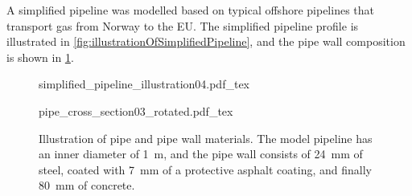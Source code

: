 A simplified pipeline was modelled based on typical offshore pipelines that transport gas from Norway to the EU. The simplified pipeline profile is illustrated in \cref{fig:illustrationOfSimplifiedPipeline}, and the pipe wall composition is shown in \cref{fig:pipeCrossSection}.



\begin{figure}[!ht]%
\centering%
\begin{minipage}{9.6cm}%
    {simplified_pipeline_illustration04.pdf_tex}%
    \\ %
    \parbox{0.9\textwidth}{%
        \vspace{2mm}%
        \caption{%
            Illustration of the simplified pipeline. The pipe is onshore and buried 2~m underground for the first and last 25~km, and 100~m below sea level and exposed to sea water for 600~km between the onshore sections. Figure created freely after figure in \cite{Helgaker2013Modeling}.%
            \label{fig:illustrationOfSimplifiedPipeline}%
        }%
    }%
\end{minipage}%
\hspace{0.099cm}%
\begin{minipage}{6.3cm}%
    {pipe_cross_section03_rotated.pdf_tex}%
    \caption{%
        Illustration of pipe and pipe wall materials. The model pipeline has an inner diameter of \SI{1}{\meter}, and the pipe wall consists of \SI{24}{mm} of steel, coated with \SI{7}{mm} of a protective asphalt coating, and finally \SI{80}{mm} of concrete.%
        \label{fig:pipeCrossSection}%
    }%
\end{minipage}%
\end{figure}

